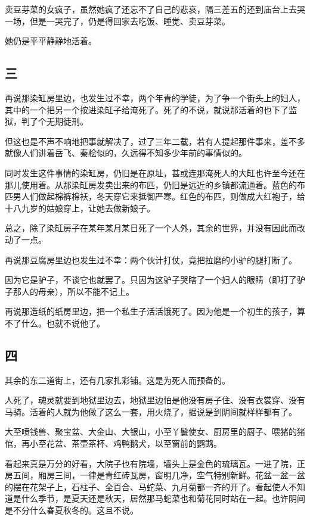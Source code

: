 \documentclass[UTF8]{ctexart}
\begin{document}
卖豆芽菜的女疯子，虽然她疯了还忘不了自己的悲哀，隔三差五的还到庙台上去哭一场，但是一哭完了，仍是得回家去吃饭、睡觉、卖豆芽菜。

她仍是平平静静地活着。

\subsection{三}

再说那染缸房里边，也发生过不幸，两个年青的学徒，为了争一个街头上的妇人，其中的一个把另一个按进染缸子给淹死了。死了的不说，就说那活着的也下了监狱，判了个无期徒刑。

但这也是不声不响地把事就解决了，过了三年二载，若有人提起那件事来，差不多就像人们讲着岳飞、秦桧似的，久远得不知多少年前的事情似的。

同时发生这件事情的染缸房，仍旧是在原址，甚或连那淹死人的大缸也许至今还在那儿使用着。从那染缸房发卖出来的布匹，仍旧是远近的乡镇都流通着。蓝色的布匹男人们做起棉裤棉袄，冬天穿它来抵御严寒。红色的布匹，则做成大红袍子，给十八九岁的姑娘穿上，让她去做新娘子。

总之，除了染缸房子在某年某月某日死了一个人外，其余的世界，并没有因此而改动了一点。

再说那豆腐房里边也发生过不幸：两个伙计打仗，竟把拉磨的小驴的腿打断了。

因为它是驴子，不谈它也就罢了。只因为这驴子哭瞎了一个妇人的眼睛（即打了驴子那人的母亲），所以不能不记上。

再说那造纸的纸房里边，把一个私生子活活饿死了。因为他是一个初生的孩子，算不了什么。也就不说他了。

\subsection{四}

其余的东二道街上，还有几家扎彩铺。这是为死人而预备的。

人死了，魂灵就要到地狱里边去，地狱里边怕是他没有房子住、没有衣裳穿、没有马骑。活着的人就为他做了这么一套，用火烧了，据说是到阴间就样样都有了。

大至喷钱兽、聚宝盆、大金山、大银山，小至丫鬟使女、厨房里的厨子、喂猪的猪倌，再小至花盆、茶壶茶杯、鸡鸭鹅犬，以至窗前的鹦鹉。

看起来真是万分的好看，大院子也有院墙，墙头上是金色的琉璃瓦。一进了院，正房五间，厢房三间，一律是青红砖瓦房，窗明几净，空气特别新鲜。花盆一盆一盆的摆在花架子上，石柱子、全百合、马蛇菜、九月菊都一齐的开了。看起使人不知道是什么季节，是夏天还是秋天，居然那马蛇菜也和菊花同时站在一起。也许阴间是不分什么春夏秋冬的。这且不说。
\end{document}
